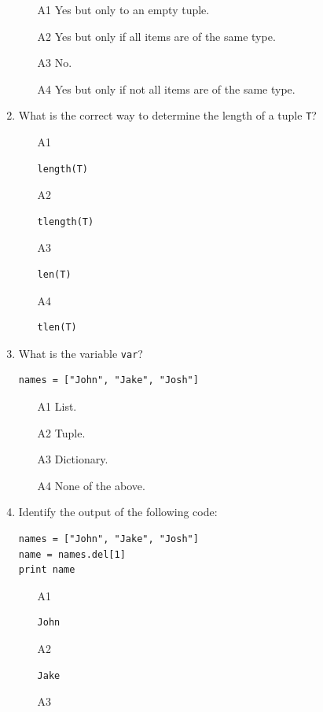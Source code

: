 \begin{enumerate}
\begin{enumerate}
\item[A1] Yes but only to an empty tuple.
\item[A2] Yes but only if all items are of the same type.
\item[A3] No.
\item[A4] Yes but only if not all items are of the same type.
\end{enumerate}
\item What is the correct way to determine the length of a tuple {\tt T}?
\begin{enumerate}
\item[A1] 
\begin{verbatim}
length(T)
\end{verbatim}
\item[A2] 
\begin{verbatim}
tlength(T)
\end{verbatim}
\item[A3] 
\begin{verbatim}
len(T)
\end{verbatim}
\item[A4] 
\begin{verbatim}
tlen(T)
\end{verbatim}
\end{enumerate}
\item What is the variable {\tt var}?
\begin{verbatim}
names = ["John", "Jake", "Josh"]
\end{verbatim}
\begin{enumerate}
\item[A1] List.
\item[A2] Tuple.
\item[A3] Dictionary.
\item[A4] None of the above.
\end{enumerate}
\item Identify the output of the following code:
\begin{verbatim}
names = ["John", "Jake", "Josh"]
name = names.del[1]
print name
\end{verbatim}
\begin{enumerate}
\item[A1] 
\begin{verbatim}
John
\end{verbatim}
\item[A2] 
\begin{verbatim}
Jake
\end{verbatim}
\item[A3] 
\begin{verbatim}

\end{verbatim}
\end{enumerate}
\end{enumerate}
